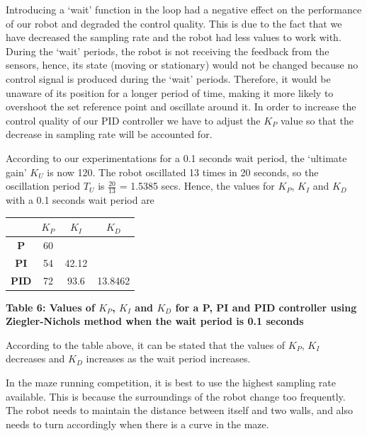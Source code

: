 \documentclass[hidelinks,a4paper,11pt]{article}
\begin{document}
\begin{mdframed}
Introducing a `wait' function in the loop had a negative effect on the performance of our robot and
degraded the control quality. This is due to the fact that we have decreased the sampling rate and
the robot had less values to work with. During the `wait' periods,   the robot is not receiving the
feedback from the sensors, hence, its state (moving or stationary) would not be changed because no
control signal is produced during the `wait' periods. Therefore, it would be unaware of its position
for a longer period of time, making it more likely to overshoot the set reference point and
oscillate around it. In order to increase the control quality of our PID controller we have to
adjust the $K_P$ value so that the decrease in sampling rate will be accounted for.

According to our experimentations for a 0.1 seconds wait period, the `ultimate gain' $K_U$ is now
120. The robot oscillated 13 times in 20 seconds, so the oscillation period $T_U$ is \(
\frac{20}{13} \) = 1.5385 secs. Hence, the values for $K_P$, $K_I$ and $K_D$ with a 0.1 seconds wait
period are
\begin{center}
	\begin{tabular}{ | c | c | c | c | } \hline
		 & \bf{$K_P$} & \bf{$K_I$} & \bf{$K_D$} \\ \hline
		\bf{P} & 60 &  &  \\ \hline
		\bf{PI} & 54 & 42.12 &  \\ \hline
		\bf{PID} & 72 & 93.6 & 13.8462 \\ \hline
	\end{tabular}
\end{center}
\vspace{3mm}
\begin{center}
\textbf{Table 6: Values of $K_P$, $K_I$ and $K_D$ for a P, PI and PID controller using
Ziegler-Nichols method when the wait period is 0.1 seconds}
\end{center}

According to the table above, it can be stated that the values of $K_P$, $K_I$ decreases and $K_D$
increases as the wait period increases.

\par In the maze running competition, it is best to use the highest sampling rate available. This is
because the surroundings of the robot change too frequently. The robot needs to maintain the
distance between itself and two walls, and also needs to turn accordingly when there is a curve in
the maze.
\end{mdframed}
\vspace*{\baselineskip}
\end{document}
